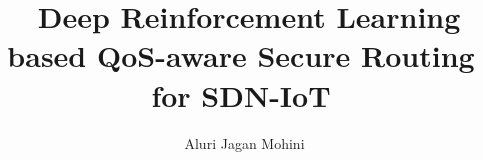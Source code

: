 \documentclass[10pt,a4paper,openright,twoside,twocolumn,DIV=35]{scrartcl}
\begin{document}
\title{\ Deep Reinforcement Learning based QoS-aware
Secure Routing for SDN-IoT}
\author{\ Aluri Jagan Mohini}
\date{\seminardate}
\maketitle
\thispagestyle{empty}




\printbibliography
\end{document}
